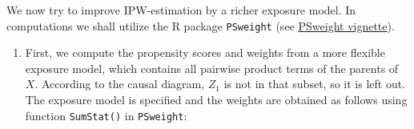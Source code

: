 \documentclass[
]{book}
\newenvironment{Shaded}{\begin{snugshade}}{\end{snugshade}}
\newcommand{\AttributeTok}[1]{\textcolor[rgb]{0.13,0.29,0.53}{#1}}
\newcommand{\ConstantTok}[1]{\textcolor[rgb]{0.56,0.35,0.01}{#1}}
\newcommand{\DecValTok}[1]{\textcolor[rgb]{0.00,0.00,0.81}{#1}}
\newcommand{\FunctionTok}[1]{\textcolor[rgb]{0.13,0.29,0.53}{\textbf{#1}}}
\newcommand{\NormalTok}[1]{#1}
\newcommand{\OtherTok}[1]{\textcolor[rgb]{0.56,0.35,0.01}{#1}}
\newcommand{\SpecialCharTok}[1]{\textcolor[rgb]{0.81,0.36,0.00}{\textbf{#1}}}
\newcommand{\StringTok}[1]{\textcolor[rgb]{0.31,0.60,0.02}{#1}}
\providecommand{\tightlist}{%
  \setlength{\itemsep}{0pt}\setlength{\parskip}{0pt}}
\begin{document}
We now try to improve IPW-estimation by a richer exposure
model. In
computations we shall utilize the R package
\texttt{PSweight} (see \href{https://cran.r-project.org/web/packages/PSweight/vignettes/vignette.pdf}{PSweight
vignette}).

\begin{enumerate}
\def\labelenumi{\arabic{enumi}.}
\tightlist
\item
  First, we compute the propensity scores
  and weights from a more flexible exposure model,
  which contains all pairwise product terms
  of the parents of \(X\).
  According to the causal diagram, \(Z_1\) is
  not in that subset, so it
  is left out. The exposure model is
  specified and the weights are
  obtained as follows using function
  \texttt{SumStat()} in \texttt{PSweight}:
\end{enumerate}

\begin{Shaded}
\end{Shaded}
\end{document}
